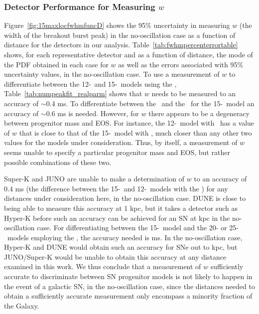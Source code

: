 \subsubsection{Detector Performance for Measuring $w$}
Figure~\ref{fig:15maxlocfwhmfuncD} shows the 95\% uncertainty in
measuring $w$ (the width of the breakout burst peak) in the
no-oscillation case as a function of distance for the detectors in our
analysis. 
Table~\ref{tab:fwhmpercenterrortable} shows, for each representative
detector and as a function of distance, the mode of the PDF obtained
in each case for $w$ as well as the 
errors associated with 95\% uncertainty values, in the no-oscillation case.
To use a measurement of $w$ to differentiate between the 12-\Msol\ and
15-\Msol\ models using the \ls,
Table~\ref{tab:numpeakfit_realparm}
 shows that $w$ needs to be measured to an accuracy  of $\sim$0.4 ms.
To differentiate between the \ls\ and the \shen\ for the
15-\Msol\ model an accuracy of $\sim$0.6 ms is needed.  However, for
$w$ there appears to be a degeneracy between progenitor mass and
EOS.  For instance, the 12-\Msol\ model with \ls\ has a
value of $w$ that is close to that of the 15-\Msol\ model with \shen,
much closer than any other two values for the models under
consideration.  Thus, by itself, 
a measurement of $w$ seems unable to
specify a particular progenitor mass and EOS, but rather
possible combinations of these two.

Super-K and JUNO are unable to make a determination of $w$ to an accuracy of
0.4 ms (the difference between the 15-\Msol\ and 12-\Msol\ models with
the \ls) for any distances under consideration here, 
in the no-oscillation case.  DUNE is close to
being able to measure this accuracy at 1 kpc, but it takes a
detector such as Hyper-K before such an accuracy can be achieved for an
SN at  kpc in the no-oscillation case.
For differentiating
between the 15-\Msol\ model and the 20- or 25-\Msol\ models employing
the \ls, the accuracy needed is  ms.  In the no-oscillation
case, Hyper-K and
 DUNE would obtain such an accuracy for SNe out to  kpc, but JUNO/Super-K would be
unable to obtain this accuracy at any distance examined in this
work.  We thus conclude that a measurement of
$w$ sufficiently accurate to discriminate between SN progenitor
models is not likely to happen in the event of a galactic SN,
in the no-oscillation case, 
since the distances needed to obtain a sufficiently accurate
measurement only encompass a minority fraction of the Galaxy.


